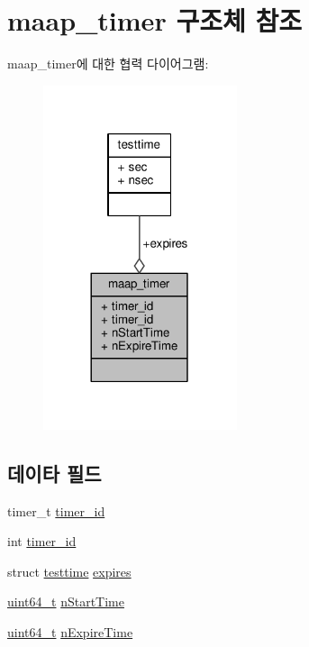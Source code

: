 \hypertarget{structmaap__timer}{}\section{maap\+\_\+timer 구조체 참조}
\label{structmaap__timer}


maap\+\_\+timer에 대한 협력 다이어그램\+:
\nopagebreak
\begin{figure}[H]
\begin{center}
\leavevmode
\includegraphics[width=161pt]{structmaap__timer__coll__graph}
\end{center}
\end{figure}
\subsection*{데이타 필드}
\begin{DoxyCompactItemize}
\item 
timer\+\_\+t \hyperlink{structmaap__timer_a1a6464bea38bc810aeb0aed8f14b5dc0}{timer\+\_\+id}
\item 
int \hyperlink{structmaap__timer_a724d31681653653604a2b744c259cd16}{timer\+\_\+id}
\item 
struct \hyperlink{structtesttime}{testtime} \hyperlink{structmaap__timer_ad187e9b153f22ba3fd0de2a0860820fa}{expires}
\item 
\hyperlink{parse_8c_aec6fcb673ff035718c238c8c9d544c47}{uint64\+\_\+t} \hyperlink{structmaap__timer_aa074c250d08298b910b1d395bcd3bd9a}{n\+Start\+Time}
\item 
\hyperlink{parse_8c_aec6fcb673ff035718c238c8c9d544c47}{uint64\+\_\+t} \hyperlink{structmaap__timer_a8be40bda552e67ed8f64804d45b36a93}{n\+Expire\+Time}
\end{DoxyCompactItemize}


